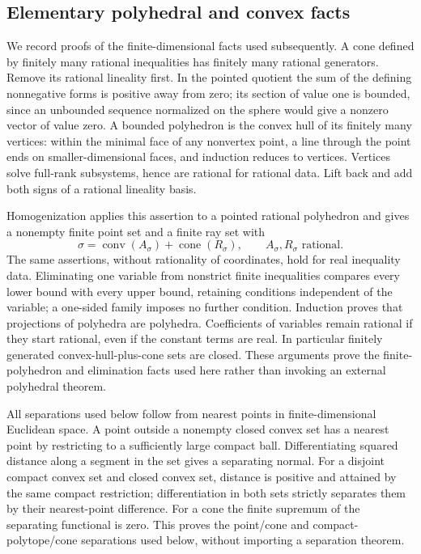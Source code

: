 \documentclass[
  11pt,
]{article}
\begin{document}
\subsection{Elementary polyhedral and convex
facts}\label{elementary-polyhedral-and-convex-facts}

We record proofs of the finite-dimensional facts used subsequently. A
cone defined by finitely many rational inequalities has finitely many
rational generators. Remove its rational lineality first. In the pointed
quotient the sum of the defining nonnegative forms is positive away from
zero; its section of value one is bounded, since an unbounded sequence
normalized on the sphere would give a nonzero vector of value zero. A
bounded polyhedron is the convex hull of its finitely many vertices:
within the minimal face of any nonvertex point, a line through the point
ends on smaller-dimensional faces, and induction reduces to vertices.
Vertices solve full-rank subsystems, hence are rational for rational
data. Lift back and add both signs of a rational lineality basis.

Homogenization applies this assertion to a pointed rational polyhedron
and gives a nonempty finite point set and a finite ray set with \[
 \sigma=\operatorname{conv}(A_\sigma)+\operatorname{cone}(R_\sigma),
                    \qquad A_\sigma,R_\sigma\text{ rational}.       \tag{4}
\] The same assertions, without rationality of coordinates, hold for
real inequality data. Eliminating one variable from nonstrict finite
inequalities compares every lower bound with every upper bound,
retaining conditions independent of the variable; a one-sided family
imposes no further condition. Induction proves that projections of
polyhedra are polyhedra. Coefficients of variables remain rational if
they start rational, even if the constant terms are real. In particular
finitely generated convex-hull-plus-cone sets are closed. These
arguments prove the finite-polyhedron and elimination facts used here
rather than invoking an external polyhedral theorem.

All separations used below follow from nearest points in
finite-dimensional Euclidean space. A point outside a nonempty closed
convex set has a nearest point by restricting to a sufficiently large
compact ball. Differentiating squared distance along a segment in the
set gives a separating normal. For a disjoint compact convex set and
closed convex set, distance is positive and attained by the same compact
restriction; differentiation in both sets strictly separates them by
their nearest-point difference. For a cone the finite supremum of the
separating functional is zero. This proves the point/cone and
compact-polytope/cone separations used below, without importing a
separation theorem.
\end{document}
